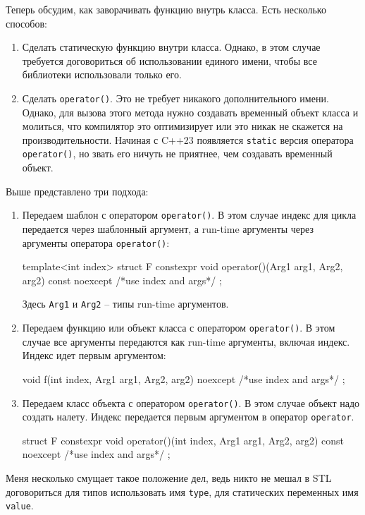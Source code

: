Теперь обсудим, как заворачивать функцию внутрь класса.
Есть несколько способов:
\begin{enumerate}
\item Сделать статическую функцию внутри класса.
Однако, в этом случае требуется договориться об использовании единого имени, чтобы все библиотеки использовали только его.

\item Сделать \verb"operator()".
Это не требует никакого дополнительного имени.
Однако, для вызова этого метода нужно создавать временный объект класса и молиться, что компилятор это оптимизирует или это никак не скажется на производительности.
Начиная с C++23 появляется \verb"static" версия оператора \verb"operator()", но звать его ничуть не приятнее, чем создавать временный объект.
\end{enumerate}
Выше представлено три подхода:
\begin{enumerate}
\item Передаем шаблон с оператором \verb"operator()".
В этом случае индекс для цикла передается через шаблонный аргумент, а run-time аргументы через аргументы оператора \verb"operator()":
\begin{cppcode}[numbers = none]
template<int index>
struct F {
  constexpr void operator()(Arg1 arg1, Arg2, arg2) const noexcept {
    /*use index and args*/
  }
};
\end{cppcode}
Здесь \verb"Arg1" и \verb"Arg2" -- типы run-time аргументов.

\item Передаем функцию или объект класса с оператором \verb"operator()".
В этом случае все аргументы передаются как run-time аргументы, включая индекс.
Индекс идет первым аргументом:
\begin{cppcode}[numbers = none]
void f(int index, Arg1 arg1, Arg2, arg2) noexcept {
    /*use index and args*/
};
\end{cppcode}

\item Передаем класс объекта с оператором \verb"operator()".
В этом случае объект надо создать налету.
Индекс передается первым аргументом в оператор \verb"operator".
\begin{cppcode}[numbers = none]
struct F {
  constexpr void operator()(int index, Arg1 arg1, Arg2, arg2) const noexcept {
    /*use index and args*/
  }
};
\end{cppcode}
\end{enumerate}
Меня несколько смущает такое положение дел, ведь никто не мешал в STL договориться для типов использовать имя \verb"type", для статических переменных имя \verb"value".
